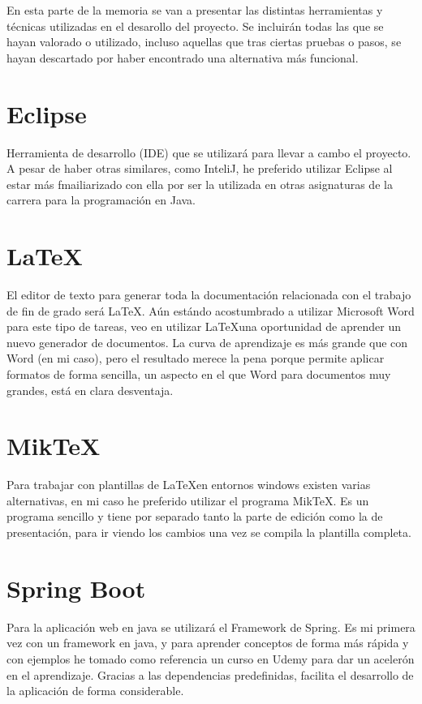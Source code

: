 

En esta parte de la memoria se van a presentar las distintas herramientas y técnicas utilizadas en el desarollo del proyecto.
Se incluirán todas las que se hayan valorado o utilizado, incluso aquellas que tras ciertas pruebas o pasos, se hayan descartado por haber encontrado una alternativa más funcional.

\section{Eclipse}

Herramienta de desarrollo (IDE) que se utilizará para llevar a cambo el proyecto.
A pesar de haber otras similares, como InteliJ, he preferido utilizar Eclipse al estar más fmailiarizado con ella por ser la utilizada en otras asignaturas de la carrera para la programación en Java.

\section{\LaTeX }
El editor de texto para generar toda la documentación relacionada con el trabajo de fin de grado será \LaTeX.
Aún estándo acostumbrado a utilizar Microsoft Word para este tipo de tareas, veo en utilizar \LaTeX  una oportunidad de aprender un nuevo generador de documentos.
La curva de aprendizaje es más grande que con Word (en mi caso), pero el resultado merece la pena porque permite aplicar formatos de forma sencilla, un aspecto en el que Word para documentos muy grandes, está en clara desventaja.

\section{Mik\TeX{}}
Para trabajar con plantillas de \LaTeX  en entornos windows existen varias alternativas, en mi caso he preferido utilizar el programa Mik\TeX{}.
Es un programa sencillo y tiene por separado tanto la parte de edición como la de presentación, para ir viendo los cambios una vez se compila la plantilla completa.

\section{Spring Boot}

Para la aplicación web en java se utilizará el Framework de Spring.
Es mi primera vez con un framework en java, y para aprender conceptos de forma más rápida y con ejemplos he tomado como referencia un curso en Udemy \cite{udemy:eliseo} para dar un acelerón en el aprendizaje.
Gracias a las dependencias predefinidas, facilita el desarrollo de la aplicación de forma considerable.

